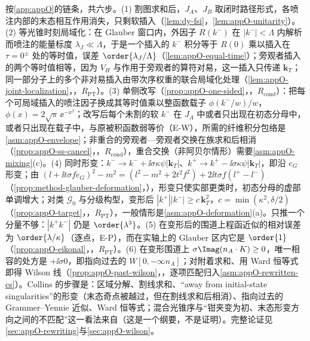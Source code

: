 \begin{proofsketch}
按\cref{app:appO}的链条，共六步。(1) 割图求和后，$J_A$、$J_B$ 取闭时路径形式，各喷注内部的末态相互作用消失，只剩软插入（\cref{lem:dy-fsi}，\cref{lem:appO-unitarity}）。(2) 等光锥时刻局域化：在 Glauber 窗口内，外因子 $R(k^-)$ 在 $|k^-|<\Lambda$ 内解析而喷注的能量标度 $\lambda_J\ll\Lambda$，于是一个插入的 $k^-$ 积分等于 $R(0)$ 乘以插入在 $\tau=0^\pm$ 处的等时值，误差 $\order{\lambda_J/\Lambda}$（\cref{lem:appO-equal-time}）；旁观者插入的两个等时值相等，因为 $V_H$ 与作用于旁观者的算符对易，这一插入只传递 $\mathbf k_T$；同一部分子上的多个非对易插入由带次序权重的联合局域化处理（\cref{lem:appO-joint-localization}，\tagR，$R_{\mathrm{PT}}$）。(3) 单侧改写（\cref{prop:appO-one-sided}，\tagR，$R_{\mathrm{cond}}$）：把每个可局域插入的喷注因子换成其等时值乘以整函数载子 $\phi(k^-/w)/w$，$\phi(x)=2\sqrt\pi\,\ee^{-x^2}$；改写后每个未割的软 $k^-$ 在 $J_A$ 中或者只出现在初态分母中，或者只出现在载子中，与原被积函数弱等价（E-W），所需的纤维积分包络是\cref{asm:appO-envelope}；非重合的旁观者—旁观者交换在族求和后相消（\cref{prop:appO-ss-cancel}，\tagR，$R_{\mathrm{cond}}$），重合交换（非阿贝尔情形）需要\cref{asm:appO-mixing}(c)。(4) 同时形变：$k^-\to k^-+\ii\sigma\kappa\psi|\mathbf k_T|$、$k^+\to k^+-\ii\sigma\kappa\psi|\mathbf k_T|$，即沿 $e_G$ 形变；由
$(l+\ii t\sigma fe_G)^2-m^2=(l^2-m^2+2t^2f^2)+2\ii t\sigma f(l^+-l^-)$（\cref{prop:method-glauber-deformation}，\tagA），形变只使实部更类时，初态分母的虚部单调增大；对类 $\mathcal G_0$ 与分级构型，变形后 $|k^+||k^-|\ge c\,\mathbf k_T^2$，$c=\min(\kappa^2,\delta/2)$（\cref{prop:appO-target}，\tagR，$R_{\mathrm{PT}}$），一般情形是\cref{asm:appO-deformation}(a)。只推一个分量不够：$|k^+k^-|$ 仍是 $\order{\lambda^3}$。(5) 在变形后的围道上程函近似的相对误差为 $\order{\lambda/\kappa}$（逐点，E-P），而在实轴上的 Glauber 区内它是 $\order{1}$（\cref{prop:appO-eikonal}，\tagR，$R_{\mathrm{PT}}$）。(6) 在变形围道上 $\sigma\Imag(n_A\cdot K)\ge0$，唯一相容的处方是 $+\ii\sigma0$，即指向过去的 $W[0,-\infty n_A]$；对附着求和、用 Ward 恒等式即得 Wilson 线（\cref{prop:appO-past-wilson}，\tagA，逐项匹配归入\cref{asm:appO-rewritten-cs}）。Collins 的步骤是：区域分解、割线求和、“away from initial-state singularities”的形变（末态奇点被越过，但在割线求和后相消）、指向过去的 Grammer--Yennie 近似、Ward 恒等式\cite[第~14.4.1~节]{Collins2011}；混合光锥序与“钳夹变为初、末态形变方向之间的不匹配”这一看法来自\cite{AybatSterman2009}（这是一个纲要，不是证明）。完整论证见\cref{sec:appO-rewriting}与\cref{sec:appO-wilson}。
\end{proofsketch}

